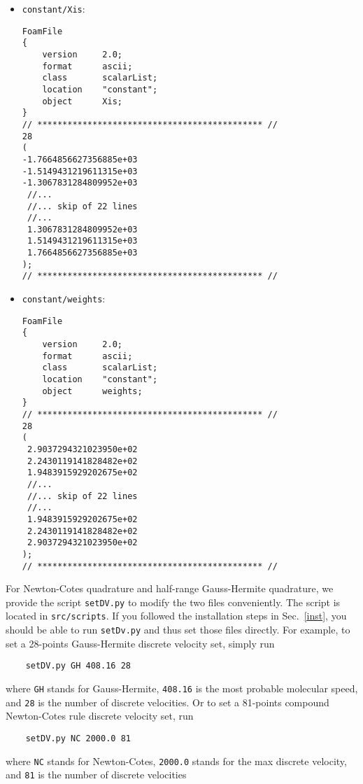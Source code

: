 \begin{itemize}
\item \verb|constant/Xis|:
\begin{verbatim}
FoamFile
{
    version     2.0;
    format      ascii;
    class       scalarList;
    location    "constant";
    object      Xis;
}
// ********************************************* //
28
(
-1.7664856627356885e+03
-1.5149431219611315e+03
-1.3067831284809952e+03
 //...
 //... skip of 22 lines
 //...
 1.3067831284809952e+03
 1.5149431219611315e+03
 1.7664856627356885e+03
);
// ********************************************* //
\end{verbatim}

\item \verb|constant/weights|:
\begin{verbatim}
FoamFile
{
    version     2.0;
    format      ascii;
    class       scalarList;
    location    "constant";
    object      weights;
}
// ********************************************* //
28
(
 2.9037294321023950e+02
 2.2430119141828482e+02
 1.9483915929202675e+02
 //...
 //... skip of 22 lines
 //...
 1.9483915929202675e+02
 2.2430119141828482e+02
 2.9037294321023950e+02
);
// ********************************************* //
\end{verbatim}
\end{itemize}
For Newton-Cotes quadrature and half-range Gauss-Hermite quadrature,
we provide the script \verb|setDV.py| to modify the two files conveniently.
The script is located in \verb|src/scripts|.
If you followed the installation steps in Sec.~\ref{inst},
you should be able to run \verb|setDv.py| and thus set those files directly.
For example, to set a 28-points Gauss-Hermite discrete velocity set, simply run
\begin{verbatim}
    setDV.py GH 408.16 28
\end{verbatim}
where \verb|GH| stands for Gauss-Hermite,  \verb|408.16| is the most probable molecular speed,
and \verb|28| is the number of discrete velocities.
Or to set a 81-points compound Newton-Cotes rule discrete velocity set, run
\begin{verbatim}
    setDV.py NC 2000.0 81
\end{verbatim}
where \verb|NC| stands for Newton-Cotes, \verb|2000.0| stands for the max discrete velocity, and \verb|81| is  the number of discrete velocities
